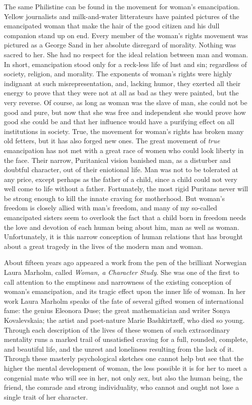 The same Philistine can be found in the movement for woman's
emancipation. Yellow journalists and milk-and-water litterateurs have
painted pictures of the e\-man\-ci\-pat\-ed woman that make the hair
of the good citizen and his dull companion stand up on end. Every
member of the woman's rights movement was pictured as a George Sand in
her absolute disregard of morality. Nothing was sacred to her. She had
no respect for the ideal relation between man and woman. In short,
emancipation stood only for a reck-less life of lust and
sin; regardless of society, religion, and morality. The exponents of
woman's rights were highly indignant at such misrepresentation, and,
lacking humor, they exerted all their energy to prove that they were
not at all as bad as they were painted, but the very reverse. Of
course, as long as woman was the slave of man, she could not be good
and pure, but now that she was free and independent she would prove
how good she could be and that her influence would have a purifying
effect on all institutions in society. True, the movement for woman's
rights has broken many old fetters, but it has also forged new ones.
The great movement of \textit{true} emancipation has not met with a
great race of women who could look liberty in the face. Their narrow,
Puritanical vision banished man, as a disturber and doubtful
character, out of their eniotional life. Man was not to be tolerated
at any price, except perhaps as the father of a child, since a child
could not very well come to life without a father. Fortunately, the
most rigid Puritans never will be strong enough to kill the innate
craving for motherhood. But woman's freedom is closely allied with
man's freedom, and many of my so-called emancipated sisters seem to
overlook the fact that a child born in freedom needs the love and
devotion of each human being about him, man as well as woman.
Unfortunately, it is this narrow conception of human relations that
has brought about a great tragedy in the lives of the modern man and
woman.

About fifteen years ago appeared a work from the pen of the brilliant
Norwegian Laura Marholm, called \textit{Woman, a Character Study}. She
was one of  the first to call attention to the emptiness and
narrowness of the existing conception of woman's emancipation, and its
tragic effect upon the inner life of woman. In her work Laura Marholm
speaks of the fate of several gifted women of international fame: the
genius Eleonora Duse; the great mathematician and writer Sonya
Kovalevskaia; the artist and poet-nature Marie Bashkirtzeff, who died
so young. Through each description of the lives of these women of such
extraordinary mentality runs a marked trail of unsatisfied craving for
a full, rounded, complete, and beautiful life, and the unrest and
loneliness resulting from the lack of it. Through these masterly
psychological sketches one cannot help but see that the higher the
mental development of woman, the less possible it is for her to meet a
congenial mate who will see in her, not only sex, but also the human
being, the friend, the comrade and strong individuality, who cannot
and ought not lose a single trait of her character.

